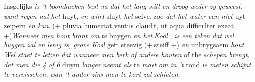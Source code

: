 \pstart Insgelijks \textit{is 't boomhacken}\protect{} \textit{best na dat het lang still en droog weder zy geweest, want regen nat het} huyt, \textit{en wind} sluyt \textit{het} selve, zoe \textit{dat het water van}  \textit{niet} uyt zeipern \textit{en kan}. (+ pluvia humectat,ventus claudit, ut aqua difficulter exeat +)\pend \pstart \textit{Wanneer men hout}\protect{} \textit{brant om te} buygen \textit{en het}  \textit{Kool} , \textit{is een teken dat wel buygen zal en lenig is, grove Kool} geft steevig (+ steiff +) \textit{en} unbuygsaem \textit{hout}\protect{}. \textit{Wel staet te letten dat wanneer men berk of andere houten}\protect{} of the \textit{schepen}\protect{} \textit{brengt, dat men die 4 of 6} duym \textit{langer neemt als} te \textit{maet}  \textit{om in 't} rond \textit{te meten schijnt te vereisschen, wan 't ander zins men te kort zal schieten}. 
